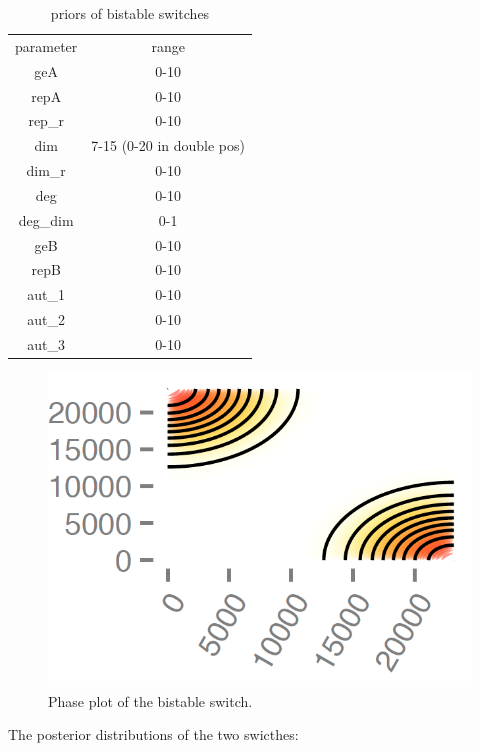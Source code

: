 \begin{table}[htbp]
\centering
\caption{priors of bistable switches}
\label{tab:priors_bi}
\begin{tabular}{cc}
parameter & range \\
geA & 0-10 \\
repA & 0-10 \\
rep\_r & 0-10 \\
dim & 7-15 (0-20 in double pos)\\
dim\_r & 0-10 \\
deg & 0-10 \\
deg\_dim & 0-1 \\
geB & 0-10 \\
repB & 0-10 \\
aut\_1 & 0-10 \\
aut\_2 & 0-10 \\
aut\_3 & 0-10
\end{tabular}
\end{table}

\begin{figure}[htbp]
\begin{center}
\includegraphics[scale=0.2]{chapterModelling/mass_action_switches/bi_stoch_images/phase_plt.png}
\caption{Phase plot of the bistable switch.}\label{fig_5}
\end{center}
\end{figure}

The posterior distributions of the two swicthes:

